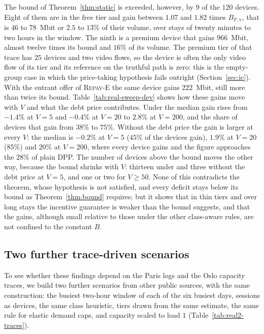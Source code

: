 The bound of Theorem~\ref{thm:static} is exceeded, however, by $9$ of the $120$ devices.
Eight of them are in the free tier and gain between $1.07$ and $1.82$ times $B_{F,\mathrm{v}}$, that is $46$ to $78$~Mbit or $2.5$ to $13\%$ of their volume, over stays of twenty minutes to two hours in the window.
The ninth is a premium device that gains $966$~Mbit, almost twelve times its bound and $16\%$ of its volume.
The premium tier of that trace has $25$ devices and two video flows, so the device is often the only video flow of its tier and its reference on the truthful path is zero: this is the empty-group case in which the price-taking hypothesis fails outright (Section~\ref{sec:ic}).
With the entrant offer of \textsc{Repay-E} the same device gains $222$~Mbit, still more than twice its bound.
Table~\ref{tab:real-sweep-dev} shows how these gains move with $V$ and what the debt price contributes.
Under \repay{} the median gain rises from $-1.4\%$ at $V=5$ and $-0.4\%$ at $V=20$ to $2.8\%$ at $V=200$, and the share of devices that gain from $38\%$ to $75\%$.
Without the debt price the gain is larger at every $V$: the median is $-0.2\%$ at $V=5$ ($45\%$ of the devices gain), $1.9\%$ at $V=20$ ($85\%$) and $20\%$ at $V=200$, where every device gains and the figure approaches the $28\%$ of plain DPP.
The number of devices above the bound moves the other way, because the bound shrinks with $V$: thirteen under \repay{} and three without the debt price at $V=5$, and one or two for $V\ge50$.
None of this contradicts the theorem, whose hypothesis is not satisfied, and every deficit stays below its bound as Theorem~\ref{thm:bound} requires; but it shows that in thin tiers and over long stays the incentive guarantee is weaker than the bound suggests, and that the gains, although small relative to those under the other class-aware rules, are not confined to the constant $B$.

\subsection{Two further trace-driven scenarios}\label{sec:exp-real2}

To see whether these findings depend on the Paris logs and the Oslo capacity traces, we build two further scenarios from other public sources, with the same construction: the busiest two-hour window of each of the six busiest days, sessions as devices, the same class heuristic, tiers drawn from the same estimate, the same rule for elastic demand caps, and capacity scaled to load $1$ (Table~\ref{tab:real2-traces}).

